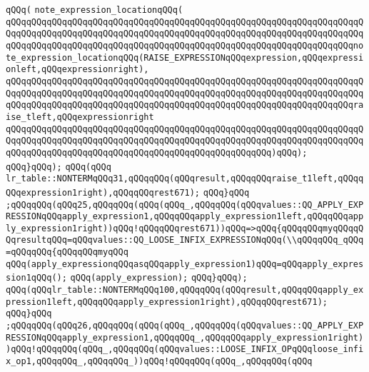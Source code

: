 \verb|qQQq(|\newline
\verb|note_expression_locationqQQq(|\newline
\verb|qQQqqQQqqQQqqQQqqQQqqQQqqQQqqQQqqQQqqQQqqQQqqQQqqQQqqQQqqQQqqQQqqQQqqQQqqQQqqQQqqQQqqQQqqQQqqQQqqQQqqQQqqQQqqQQqqQQqqQQqqQQqqQQqqQQqqQQqqQQqqQQqqQQqqQQqqQQqqQQqqQQqqQQqqQQqqQQqqQQqqQQqqQQqqQQqqQQqqQQqqQQqqQQqnote_expression_locationqQQq(RAISE_EXPRESSIONqQQqexpression,qQQqexpressionleft,qQQqexpressionright),|\newline
\verb|qQQqqQQqqQQqqQQqqQQqqQQqqQQqqQQqqQQqqQQqqQQqqQQqqQQqqQQqqQQqqQQqqQQqqQQqqQQqqQQqqQQqqQQqqQQqqQQqqQQqqQQqqQQqqQQqqQQqqQQqqQQqqQQqqQQqqQQqqQQqqQQqqQQqqQQqqQQqqQQqqQQqqQQqqQQqqQQqqQQqqQQqqQQqqQQqqQQqqQQqqQQqqQQqraise_tleft,qQQqexpressionright|\newline
\verb|qQQqqQQqqQQqqQQqqQQqqQQqqQQqqQQqqQQqqQQqqQQqqQQqqQQqqQQqqQQqqQQqqQQqqQQqqQQqqQQqqQQqqQQqqQQqqQQqqQQqqQQqqQQqqQQqqQQqqQQqqQQqqQQqqQQqqQQqqQQqqQQqqQQqqQQqqQQqqQQqqQQqqQQqqQQqqQQqqQQqqQQqqQQqqQQq)qQQq);|\newline
\verb|qQQq}qQQq);|\newline
\verb|qQQq(qQQq|\newline
\verb|lr_table::NONTERMqQQq31,qQQqqQQq(qQQqresult,qQQqqQQqraise_t1left,qQQqqQQqexpression1right),qQQqqQQqrest671);|\newline
\verb|qQQq}qQQq|\newline
\verb|;qQQqqQQq(qQQq25,qQQqqQQq(qQQq(qQQq_,qQQqqQQq(qQQqvalues::QQ_APPLY_EXPRESSIONqQQqapply_expression1,qQQqqQQqapply_expression1left,qQQqqQQqapply_expression1right))qQQq!qQQqqQQqrest671))qQQq=>qQQq{qQQqqQQqmyqQQqqQQqresultqQQq=qQQqvalues::QQ_LOOSE_INFIX_EXPRESSIONqQQq(\\qQQqqQQq_qQQq=qQQqqQQq{qQQqqQQqmyqQQq|\newline
\verb|qQQq(apply_expressionqQQqasqQQqapply_expression1)qQQq=qQQqapply_expression1qQQq();|\newline
\verb|qQQq(apply_expression);|\newline
\verb|qQQq}qQQq);|\newline
\verb|qQQq(qQQqlr_table::NONTERMqQQq100,qQQqqQQq(qQQqresult,qQQqqQQqapply_expression1left,qQQqqQQqapply_expression1right),qQQqqQQqrest671);|\newline
\verb|qQQq}qQQq|\newline
\verb|;qQQqqQQq(qQQq26,qQQqqQQq(qQQq(qQQq_,qQQqqQQq(qQQqvalues::QQ_APPLY_EXPRESSIONqQQqapply_expression1,qQQqqQQq_,qQQqqQQqapply_expression1right))qQQq!qQQqqQQq(qQQq_,qQQqqQQq(qQQqvalues::LOOSE_INFIX_OPqQQqloose_infix_op1,qQQqqQQq_,qQQqqQQq_))qQQq!qQQqqQQq(qQQq_,qQQqqQQq(qQQq|\newline
